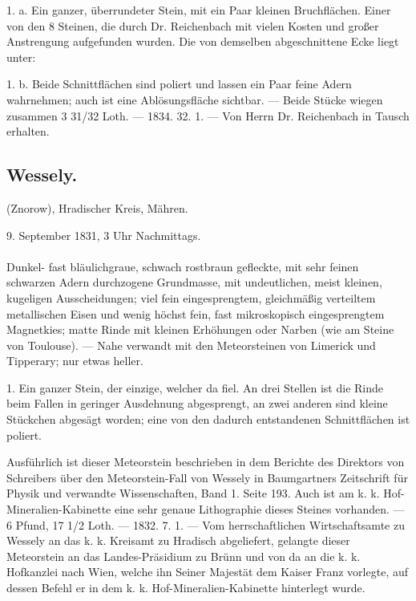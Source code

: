 \documentclass[a4paper, 11pt, oneside, polutonikogreek, german]{article}
\begin{document}
1. a. Ein ganzer, überrundeter Stein, mit ein Paar kleinen Bruchflächen. Einer von den 8 Steinen, die durch Dr. Reichenbach mit vielen Kosten und großer Anstrengung aufgefunden wurden. Die von demselben abgeschnittene Ecke liegt unter:

1. b. Beide Schnittflächen sind poliert und lassen ein Paar feine Adern wahrnehmen; auch ist eine Ablösungsfläche sichtbar. — Beide Stücke wiegen zusammen 3 31/32 Loth. — 1834. 32. 1. — Von Herrn Dr. Reichenbach in Tausch erhalten.
\subsection{Wessely.}
\begin{center}
\small
(Znorow), Hradischer Kreis, Mähren.

9. September 1831, 3 Uhr Nachmittags.
\end{center}
\paragraph{}
Dunkel- fast bläulichgraue, schwach rostbraun gefleckte, mit sehr feinen schwarzen Adern durchzogene Grundmasse, mit undeutlichen, meist kleinen, kugeligen Ausscheidungen; viel fein eingesprengtem, gleichmäßig verteiltem metallischen Eisen und wenig höchst fein, fast mikroskopisch eingesprengtem Magnetkies; matte Rinde mit kleinen Erhöhungen oder Narben (wie am Steine von Toulouse). — Nahe verwandt mit den Meteorsteinen von Limerick und Tipperary; nur etwas heller.

1. Ein ganzer Stein, der einzige, welcher da fiel. An drei Stellen ist die Rinde beim Fallen in geringer Ausdehnung abgesprengt, an zwei anderen sind kleine Stückchen abgesägt worden; eine von den dadurch entstandenen Schnittflächen ist poliert.

Ausführlich ist dieser Meteorstein beschrieben in dem Berichte des Direktors von Schreibers über den Meteorstein-Fall von Wessely in Baumgartners Zeitschrift für Physik und verwandte Wissenschaften, Band 1. Seite 193. Auch ist am k. k. Hof-Mineralien-Kabinette eine sehr genaue Lithographie dieses Steines vorhanden. — 6 Pfund, 17 1/2 Loth. — 1832. 7. 1. — Vom herrschaftlichen Wirtschaftsamte zu Wessely an das k. k. Kreisamt zu Hradisch abgeliefert, gelangte dieser Meteorstein an das Landes-Präsidium zu Brünn und von da an die k. k. Hofkanzlei nach Wien, welche ihn Seiner Majestät dem Kaiser Franz vorlegte, auf dessen Befehl er in dem k. k. Hof-Mineralien-Kabinette hinterlegt wurde.
\end{document}

